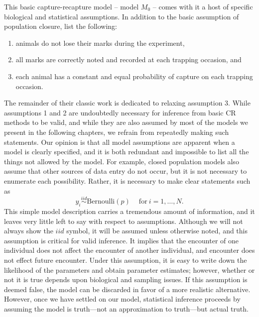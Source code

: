 This  basic capture-recapture model -- model $M_{0}$ -- comes with it
a host of specific biological and statistical assumptions.
In addition to the basic assumption of population closure,
\citet{otis_etal:1978} list the following:
\begin{enumerate}
  \item animals do not lose their marks during the experiment,
  \item all marks are correctly noted and recorded at each trapping
    occasion, and
  \item each animal has a constant and equal probability of capture on
    each trapping occasion.
\end{enumerate}
The remainder of their classic work is dedicated to relaxing
assumption 3. While assumptions 1 and 2 are undoubtedly necessary for
inference from basic CR methods to be valid, and while they are
also assumed by most of the models we present in the following
chapters, we refrain from repeatedly making such statements. Our
opinion is that all model assumptions are apparent when a model is
clearly specified, and it is both redundant and impossible to list all
the things not allowed by the model. For example, closed population
models also assume that other sources of data entry do not occur, but
it is not necessary to enumerate each possibility. Rather, it is
necessary to make clear statements such as
\[
y_i \stackrel{iid}{\sim} \text{Bernoulli}(p) \quad \: \text{for}\: i=1,\ldots,N.
\]
This simple model description carries a tremendous amount of
information, and it leaves very little left to say with respect to
assumptions. Although we will not always show the $iid$ symbol, it
will be assumed unless otherwise noted, and this assumption is
critical for valid inference. It implies that the encounter of one
individual does not affect the encounter of another
individual, and encounter does not effect future encounter. Under this assumption, it is  easy to write down the
likelihood of the parameters and obtain parameter estimates; however,
whether or not it is true depends upon biological and sampling
issues. If this assumption is deemed false, the model can be discarded
in favor of a more realistic alternative. However, once we have
settled on our model, statistical inference proceeds by assuming the
model is truth---not an approximation to truth---but actual
truth.

